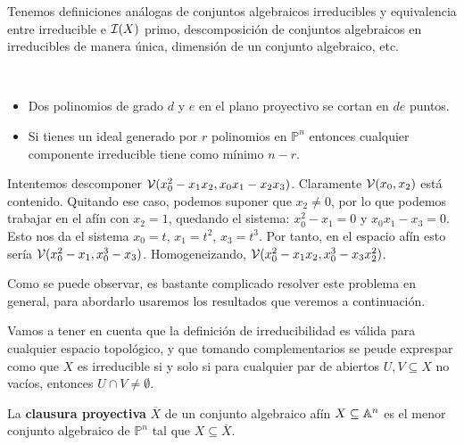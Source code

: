 \documentclass[ACGA.tex]{subfiles}
\begin{document}
Tenemos definiciones análogas de conjuntos algebraicos irreducibles y equivalencia entre irreducible e $\mathcal{I}(X)$ primo, descomposición de conjuntos algebraicos en irreducibles de manera única, dimensión de un conjunto algebraico, etc.

\begin{nota}\
\begin{itemize}


\item Dos polinomios de grado $d$ y $e$ en el plano proyectivo se cortan en $de$ puntos.

\item Si tienes un ideal generado por $r$ polinomios en $\mathbb{P}^n$ entonces cualquier componente irreducible tiene como mínimo $n-r$.
\end{itemize}
\end{nota}

\begin{ejer}
Intentemos descomponer $\mathcal{V}(x_0^2-x_1x_2,x_0x_1-x_2x_3)$. Claramente $\mathcal{V}(x_0,x_2)$ está contenido. Quitando ese caso, podemos suponer que $x_2\neq 0$, por lo que podemos trabajar en el afín con $x_2=1$, quedando el sistema: $x_0^2-x_1=0$ y $x_0x_1-x_3=0$. Esto nos da el sistema $x_0 = t$, $x_1=t^2$, $x_3=t^3$. Por tanto, en el espacio afín esto sería $\mathcal{V}(x_0^2-x_1,x_0^3-x_3)$. Homogeneizando, $\mathcal{V}(x_0^2-x_1x_2,x_0^3-x_3x_2^2)$. 

Como se puede observar, es bastante complicado resolver este problema en general, para abordarlo usaremos los resultados que veremos a continuación.

 
\end{ejer}

Vamos a tener en cuenta que la definición de irreducibilidad es válida para cualquier espacio topológico, y que tomando complementarios se peude exprespar como que $X$ es irreducible si y solo si para cualquier par de abiertos $U,V\subseteq X$ no vacíos, entonces $U\cap V\neq\emptyset$.

\begin{defi}
La \textbf{clausura proyectiva} $\overline{X}$ de un conjunto algebraico afín $X\subseteq\mathbb{A}^n$ es el menor conjunto algebraico de $\mathbb{P}^n$ tal que $X\subseteq\overline{X}$.
\end{defi}
\end{document}
